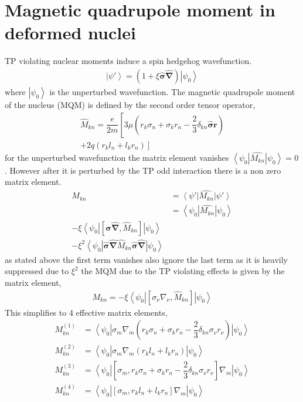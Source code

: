 \documentclass[8pt,a4paper, twoside]{report}
\begin{document}
\section{Magnetic quadrupole moment in deformed nuclei}
TP violating nuclear moments induce a spin hedgehog wavefunction.
\begin{align*}
\left|\psi'\right> = \left(1 + \xi\hat{\boldsymbol{\sigma}}\hat{\boldsymbol{\nabla}}\right)\left|\psi_0\right>
\end{align*}
where $\left|\psi_0\right>$ is the unperturbed wavefunction. The magnetic quadrupole moment of the nucleus (MQM) is defined by the second order tensor operator,
\begin{align*}
\hat{M}_{kn} = \dfrac{e}{2m}\left[3\mu\left(r_k\sigma_n + \sigma_kr_n - \dfrac{2}{3}\delta_{kn}\hat{\boldsymbol{\sigma}}\textbf{r}\right) \right. \\
\left. + 2q\left(r_kl_n + l_kr_n\right)\right]
\end{align*}
for the unperturbed wavefunction the matrix element vanishes $\left<\psi_0\right|\hat{M_{kn}}\left|\psi_0\right> = 0$. However after it is perturbed by the TP odd interaction there is a non zero matrix element.
\begin{align*}
M_{kn} &= \left<\psi'\right|\hat{M_{kn}}\left|\psi'\right> \\
&= \left<\psi_0\right|\hat{M_{kn}}\left|\psi_0\right> \\
-\xi  \left<\psi_0\right|\left[\hat{\boldsymbol{\sigma}}\hat{\boldsymbol{\nabla}}, \hat{M}_{kn}\right]\left|\psi_0\right> \\ - \xi^{2} \left<\psi_0\right|\hat{\boldsymbol{\sigma}}\hat{\boldsymbol{\nabla}}\hat{M}_{kn}\hat{\boldsymbol{\sigma}}\hat{\boldsymbol{\nabla}}\left|\psi_0\right>
\end{align*}
as stated above the first term vanishes also ignore the last term as it is heavily suppressed due to $\xi^2$ the MQM due to the TP violating effects is given by the matrix element,
\begin{align*}
M_{kn} = -\xi  \left<\psi_0\right|\left[\sigma_{\nu}\nabla_{\nu}, \hat{M}_{kn}\right]\left|\psi_0\right>
\end{align*}
This simplifies to 4 effective matrix elements,
\begin{align*}
M^{(1)}_{kn} &= \left<\psi_0\right|\sigma_m\nabla_m\left(r_k\sigma_n + \sigma_kr_n - \dfrac{2}{3}\delta_{kn}\sigma_{\nu}r_{\nu}\right)\left|\psi_0\right> \\
M^{(2)}_{kn} &= \left<\psi_0\right|\sigma_m\nabla_m\left(r_kl_n + l_kr_n\right)\left|\psi_0\right> \\
M^{(3)}_{kn} &=  \left<\psi_0\right|\left[\sigma_m , r_k\sigma_n + \sigma_kr_n -\dfrac{2}{3}\delta_{kn}\sigma_{\nu}r_{\nu}\right]\nabla_m\left|\psi_0\right> \\
M^{(4)}_{kn} &= \left<\psi_0\right|\left[\sigma_m, r_kl_n + l_kr_n\right]\nabla_m\left|\psi_0\right>
\end{align*}
\end{document}
